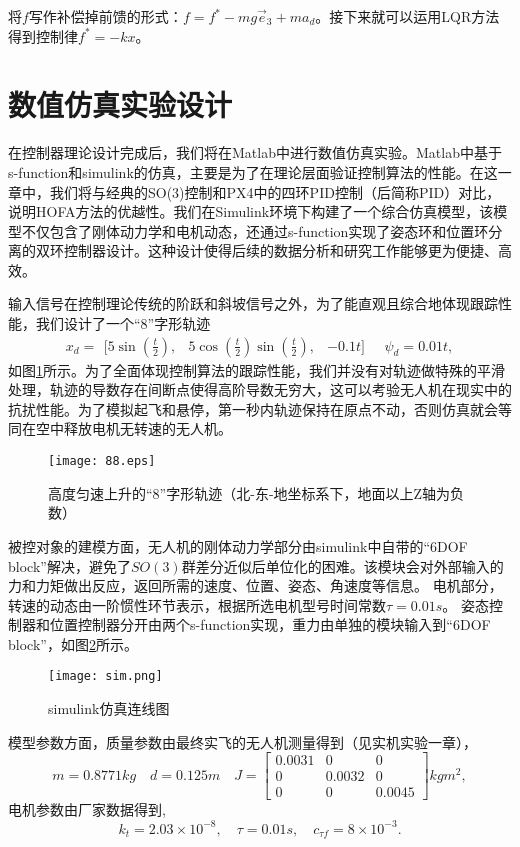将$f$写作补偿掉前馈的形式：$f=f^*-mg \vec e_3 +m a_d$。接下来就可以运用LQR方法得到控制律$f^*=-kx$。

\section{数值仿真实验设计}
在控制器理论设计完成后，我们将在Matlab中进行数值仿真实验。Matlab中基于s-function和simulink的仿真，主要是为了在理论层面验证控制算法的性能。在这一章中，我们将与经典的SO(3)控制和PX4中的四环PID控制（后简称PID）对比，说明HOFA方法的优越性。我们在Simulink环境下构建了一个综合仿真模型，该模型不仅包含了刚体动力学和电机动态，还通过s-function实现了姿态环和位置环分离的双环控制器设计。这种设计使得后续的数据分析和研究工作能够更为便捷、高效。

输入信号在控制理论传统的阶跃和斜坡信号之外，为了能直观且综合地体现跟踪性能，我们设计了一个“8”字形轨迹
$$x_d = \begin{matrix}[5\sin(\frac{t}{2}), & 5\cos(\frac{t}{2})\sin(\frac{t}{2}), &-0.1t]\end{matrix}
\quad
\psi_d=0.01t,$$
如图\ref{fig:8}所示。为了全面体现控制算法的跟踪性能，我们并没有对轨迹做特殊的平滑处理，轨迹的导数存在间断点使得高阶导数无穷大，这可以考验无人机在现实中的抗扰性能。为了模拟起飞和悬停，第一秒内轨迹保持在原点不动，否则仿真就会等同在空中释放电机无转速的无人机。
\begin{figure}[!h]
  \centering
  \texttt{[image: 88.eps]}
  \caption{高度匀速上升的“8”字形轨迹（北-东-地坐标系下，地面以上Z轴为负数）}
  \label{fig:8}
\end{figure}

被控对象的建模方面，无人机的刚体动力学部分由simulink中自带的“6DOF block”解决，避免了$SO(3)$群差分近似后单位化的困难。该模块会对外部输入的力和力矩做出反应，返回所需的速度、位置、姿态、角速度等信息。
电机部分，转速的动态由一阶惯性环节表示，根据所选电机型号时间常数$\tau=0.01s$。
姿态控制器和位置控制器分开由两个s-function实现，重力由单独的模块输入到“6DOF block”，如图\ref{fig:sim}所示。
\begin{figure}[!h]
    \centering
    \texttt{[image: sim.png]}
    \caption{simulink仿真连线图}
    \label{fig:sim}
  \end{figure}

模型参数方面，质量参数由最终实飞的无人机测量得到（见实机实验一章），
$$m=0.8771kg \quad d=0.125m \quad J=\begin{bmatrix}
  0.0031   &      0  &       0\\
  0 &   0.0032      &   0\\
  0  &       0   & 0.0045
\end{bmatrix}kg m^2,$$
电机参数由厂家数据得到,
$$k_t=2.03\times 10^{-8} ,\quad 
\tau=0.01s, \quad
c_{\tau f}=8\times 10^{-3}.$$

